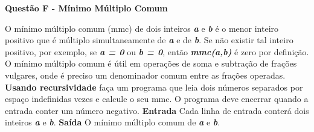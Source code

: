 \documentclass[a4paper, 12pt]{article}
\begin{document}
\newpage %
\begin{center}
\textbf{{\Large Questão F - Mínimo Múltiplo Comum}}
\end{center}
\vspace{5pt}
O mínimo múltiplo comum (mmc) de dois inteiros \textbf{\textit{a}} e \textbf{\textit{b}} é o menor inteiro positivo que é múltiplo simultaneamente de \textbf{\textit{a}} e de \textbf{\textit{b}}. Se não existir tal inteiro positivo, por exemplo, se \textbf{\textit{a = 0}} ou \textbf{\textit{b = 0}}, então \textbf{\textit{mmc(a,b)}} é zero por definição. O mínimo múltiplo comum é útil em operações de soma e subtração de frações vulgares, onde é preciso um denominador comum entre as frações operadas. \textbf{Usando recursividade} faça um programa que leia dois números separados por espaço indefinidas vezes e calcule o seu mmc. O programa deve encerrar quando a entrada conter um número negativo.
\newline \newline
\textbf{{\large Entrada}} \newline
Cada linha de entrada conterá dois inteiros \textbf{\textit{a}} e \textbf{\textit{b}}.
\newline \newline
\textbf{{\large Saída}} \newline
O mínimo múltiplo comum de \textbf{\textit{a}} e \textbf{\textit{b}}.
\newline
\end{document}

